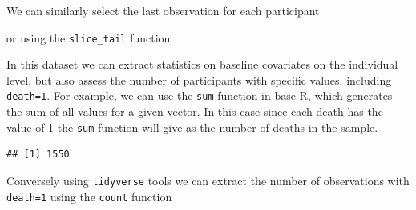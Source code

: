 \documentclass[
]{book}
\newenvironment{Shaded}{\begin{snugshade}}{\end{snugshade}}
\newcommand{\DataTypeTok}[1]{\textcolor[rgb]{0.13,0.29,0.53}{#1}}
\newcommand{\DecValTok}[1]{\textcolor[rgb]{0.00,0.00,0.81}{#1}}
\newcommand{\KeywordTok}[1]{\textcolor[rgb]{0.13,0.29,0.53}{\textbf{#1}}}
\newcommand{\NormalTok}[1]{#1}
\newcommand{\OperatorTok}[1]{\textcolor[rgb]{0.81,0.36,0.00}{\textbf{#1}}}
\newcommand{\StringTok}[1]{\textcolor[rgb]{0.31,0.60,0.02}{#1}}
\begin{document}
We can similarly select the last observation for each participant

\begin{Shaded}
\end{Shaded}

or using the \texttt{slice\_tail} function

\begin{Shaded}
\end{Shaded}

In this dataset we can extract statistics on baseline covariates on the individual level, but also assess the number of participants with specific values, including \texttt{death=1}. For example, we can use the \texttt{sum} function in base R, which generates the sum of all values for a given vector. In this case since each death has the value of 1 the \texttt{sum} function will give as the number of deaths in the sample.

\begin{Shaded}
\end{Shaded}

\begin{verbatim}
## [1] 1550
\end{verbatim}

Conversely using \texttt{tidyverse} tools we can extract the number of observations with \texttt{death=1} using the \texttt{count} function

\begin{Shaded}
\end{Shaded}
\end{document}

